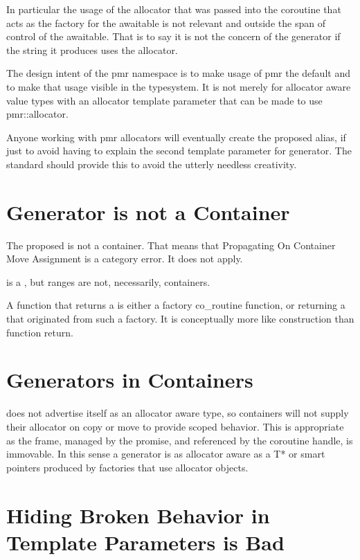 \documentclass[a4paper,10pt,oneside,openany,final,article]{memoir}
\begin{document}
In particular the usage of the allocator that was passed into the coroutine that acts as the factory for the awaitable is not relevant and outside the span of control of the awaitable. That is to say it is not the concern of the generator if the string it produces uses the allocator.

The design intent of the pmr namespace is to make usage of pmr the default and to make that usage visible in the typesystem. It is not merely for allocator aware value types with an allocator template parameter that can be made to use pmr::allocator.

Anyone working with pmr allocators will eventually create the proposed alias, if just to avoid having to explain the second template parameter for generator. The standard should provide this to avoid the utterly needless creativity.

\chapter{Generator is not a Container}

The proposed  is not a container. That means that Propagating On Container Move Assignment is a category error. It does not apply.

 is a , but ranges are not, necessarily, containers.

A function that returns a  is either a factory co_routine function, or returning a  that originated from such a factory. It is conceptually more like construction than function return.

\chapter{Generators in Containers}
 does not advertise itself as an allocator aware type, so containers will not supply their allocator on copy or move to provide scoped behavior. This is appropriate as the frame, managed by the promise, and referenced by the coroutine handle, is immovable. In this sense a generator is as allocator aware as a T* or smart pointers produced by factories that use allocator objects.


\chapter{Hiding Broken Behavior in Template Parameters is Bad}
\end{document}

